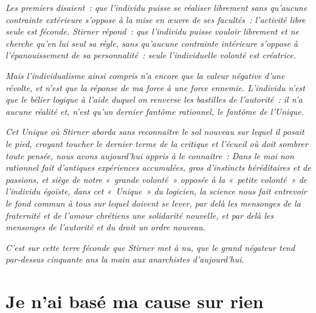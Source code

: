 \documentclass[french,twoside]{book} %
\newcommand{\dateline}[1]{\medskip{\RaggedLeft{#1}\par}\bigskip}
\newcommand{\signed}[1]{\bigbreak\filbreak{\raggedleft #1\par}\medskip}
\begin{document}
\emph{Les premiers disaient : que l’individu puisse se réaliser librement sans qu’aucune contrainte extérieure s’oppose à la mise en œuvre de ses facultés : l’activité libre seule est féconde. Stirner répond : que l’individu puisse vouloir librement et ne cherche qu’en lui seul sa règle, sans qu’aucune contrainte intérieure s’oppose à l’épanouissement de sa personnalité : seule l’individuelle volonté est créatrice.}\par
\emph{Mais l’individualisme ainsi compris n’a encore que la valeur négative d’une révolte, et n’est que la réponse de ma force à une force ennemie. L’individu n’est que le bélier logique à l’aide duquel on renverse les bastilles de l’autorité : il n’a aucune réalité et, n’est qu’un dernier fantôme rationnel, le fantôme de l’Unique.}\par
\emph{Cet Unique où Stirner aborda sans reconnaître le sol nouveau sur lequel il posait le pied, croyant toucher le dernier terme de la critique et l’écueil où doit sombrer toute pensée, nous avons aujourd’hui appris à le connaître : Dans le moi non rationnel fait d’antiques expériences accumulées, gros d’instincts héréditaires et de passions, et siège de notre « grande volonté » opposée à la « petite volonté » de l’individu égoïste, dans cet « Unique » du logicien, la science nous fait entrevoir le fond commun à tous  sur lequel doivent se lever, par delà les mensonges de la fraternité et de l’amour chrétiens une solidarité nouvelle, et par delà les mensonges de l’autorité et du droit un ordre nouveau.}\par
\emph{C’est sur cette terre féconde que Stirner met à nu, que le grand négateur tend par-dessus cinquante ans la main aux anarchistes d’aujourd’hui.}\par


\signed{R.-L. R{\scshape eclaire}}

\dateline{\emph{Décembre 1899.}}
 \mainmatter  \section[{Je n’ai basé ma cause sur rien}]{Je n’ai basé ma cause sur rien}\renewcommand{\leftmark}{Je n’ai basé ma cause sur rien}
\end{document}
